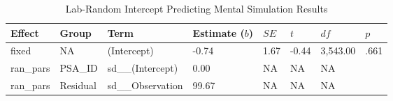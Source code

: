 \documentclass[
  man,mask,floatsintext]{apa7}
\begin{document}
\begin{table}[tbp]

\begin{center}
\begin{threeparttable}

\caption{\label{tab:pred_lab}Lab-Random Intercept Predicting Mental Simulation Results}

\begin{tabular}{llllllll}
\toprule
Effect & Group & Term & Estimate ($b$) & $SE$ & $t$ & $df$ & $p$\\
\midrule
fixed & NA & (Intercept) & -0.74 & 1.67 & -0.44 & 3,543.00 & .661\\
ran\_pars & PSA\_ID & sd\_\_(Intercept) & 0.00 & NA & NA & NA & \\
ran\_pars & Residual & sd\_\_Observation & 99.67 & NA & NA & NA & \\
\bottomrule
\end{tabular}

\end{threeparttable}
\end{center}

\end{table}
\end{document}
